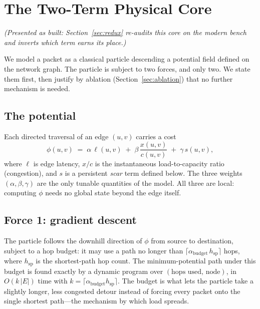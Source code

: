 \section{The Two-Term Physical Core}
\label{sec:core}

\noindent\emph{(Presented as built: Section~\ref{sec:redux} re-audits this core on the modern bench and inverts which term earns its place.)}

We model a packet as a classical particle descending a potential field
defined on the network graph. The particle is subject to two forces, and
only two. We state them first, then justify by ablation
(Section~\ref{sec:ablation}) that no further mechanism is needed.

\subsection{The potential}

Each directed traversal of an edge $(u,v)$ carries a cost
\begin{equation}
\phi(u,v) \;=\; \alpha\,\ell(u,v) \;+\; \beta\,\frac{x(u,v)}{c(u,v)} \;+\; \gamma\,s(u,v),
\label{eq:potential}
\end{equation}
where $\ell$ is edge latency, $x/c$ is the instantaneous load-to-capacity
ratio (congestion), and $s$ is a persistent \emph{scar} term defined below.
The three weights $(\alpha,\beta,\gamma)$ are the only tunable quantities of
the model. All three are local: computing $\phi$ needs no global state beyond
the edge itself.

\subsection{Force 1: gradient descent}

The particle follows the downhill direction of $\phi$ from source to
destination, subject to a hop budget: it may use a path no longer than
$\lceil \alpha_{\text{budget}}\, h_{\text{sp}} \rceil$ hops, where
$h_{\text{sp}}$ is the shortest-path hop count. The minimum-potential path
under this budget is found exactly by a dynamic program over
$(\text{hops used},\, \text{node})$, in $O(k\,|E|)$ time with
$k=\lceil\alpha_{\text{budget}} h_{\text{sp}}\rceil$.
The budget is what lets the particle take a slightly longer, less congested
detour instead of forcing every packet onto the single shortest path---the
mechanism by which load spreads.

